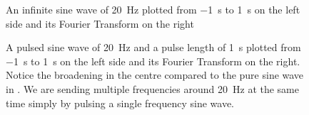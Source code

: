 \begin{figure}[htb]
    
    \caption{An infinite sine wave of \qty{20}{\hertz} plotted from \qty{-1}{\second} to \qty{1}{\second} on the left side and its Fourier Transform on the right}
\end{figure}

\begin{figure}[htb]
    
    \caption{A pulsed sine wave of \qty{20}{\hertz} and a pulse length of \qty{1}{\second} plotted from \qty{-1}{\second} to \qty{1}{\second} on the left side and its Fourier Transform on the right. Notice the broadening in the centre compared to the pure sine wave in . We are sending multiple frequencies around \qty{20}{\hertz} at the same time simply by pulsing a single frequency sine wave.}
\end{figure}
